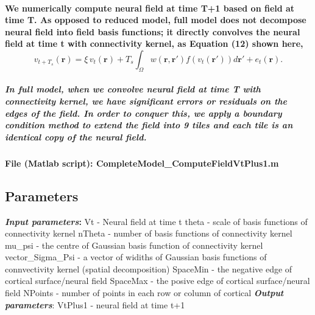 \documentclass[a4paper, 12pt, english]{article}
\begin{document}
\paragraph{We numerically compute neural field at time T+1 based on field at time T.
As opposed to reduced model, full model does not decompose neural field into field basis functions; it directly convolves
the neural field at time t with connectivity kernel, as Equation (12) shown here,
$$v_{t+T_s}(\boldsymbol{r}) = \xi\,v_t(\boldsymbol{r}) + T_s\int_{\Omega}w(\boldsymbol{r}, \boldsymbol{r\prime})f(v_t(\boldsymbol{r\prime}))d\boldsymbol{r\prime} + e_t(\boldsymbol{r}).$$}

\subparagraph{In full model, when we convolve neural field at time T with connectivity kernel,
we have significant errors or residuals on the edges of the field. In order to conquer this,
we apply a boundary condition method to extend the field into 9 tiles and each tile is an identical copy
of the neural field.}

\paragraph{File (Matlab script): CompleteModel\_ComputeFieldVtPlus1.m}

\subsection{Parameters}
\textbf{\textit{Input parameters}:}\newline
Vt - Neural field at time t\newline
theta - scale of basis functions of connectivity kernel\newline
nTheta - number of basis functions of connectivity kernel\newline
mu\_psi - the centre of Gaussian basis function of connectivity kernel\newline
vector\_Sigma\_Psi - a vector of widiths of Gaussian basis functions of
connvectivity kernel (spatial decomposition)\newline
SpaceMin - the negative edge of cortical surface/neural field\newline
SpaceMax - the posive edge of cortical surface/neural field\newline
NPoints - number of points in each row or column of cortical\newline
\textbf{\textit{Output parameters}}:\newline
VtPlus1 - neural field at time t+1\newline
\end{document}
